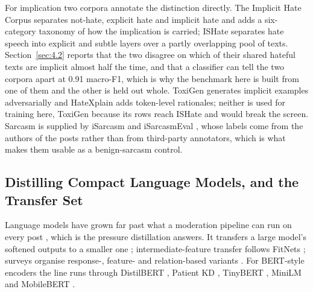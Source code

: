 For implication two corpora annotate the distinction directly. The Implicit Hate Corpus
\cite{elsherief2021latent} separates not-hate, explicit hate and implicit hate and adds a six-category
taxonomy of how the implication is carried; ISHate \cite{ocampo2023indepth} separates hate speech into
explicit and subtle layers over a partly overlapping pool of texts. Section~\ref{sec:4.2} reports that
the two disagree on which of their shared hateful texts are implicit almost half the time, and that a
classifier can tell the two corpora apart at 0.91 macro-F1, which is why the benchmark here is built
from one of them and the other is held out whole. ToxiGen \cite{hartvigsen2022toxigen} generates
implicit examples adversarially and HateXplain \cite{mathew2021hatexplain} adds token-level rationales;
neither is used for training here, ToxiGen because its rows reach ISHate and would break the screen.
Sarcasm is supplied by iSarcasm and iSarcasmEval \cite{oprea2020isarcasm, abufarha2022semeval}, whose
labels come from the authors of the posts rather than from third-party annotators, which is what makes
them usable as a benign-sarcasm control.

\subsection{Distilling Compact Language Models, and the Transfer Set}
\label{sec:2.2}
Language models have grown far past what a moderation pipeline can run on every post
\cite{brown2020language}, which is the pressure distillation answers. It transfers a large model's
softened outputs to a smaller one \cite{hinton2015distilling, bucilua2006model};
intermediate-feature transfer follows FitNets \cite{romero2015fitnets}; surveys organise response-,
feature- and relation-based variants \cite{gou2021knowledge}. For BERT-style encoders the line runs
through DistilBERT \cite{sanh2019distilbert}, Patient KD \cite{sun2019patient}, TinyBERT
\cite{jiao2020tinybert}, MiniLM \cite{wang2020minilm} and MobileBERT \cite{sun2020mobilebert}.

